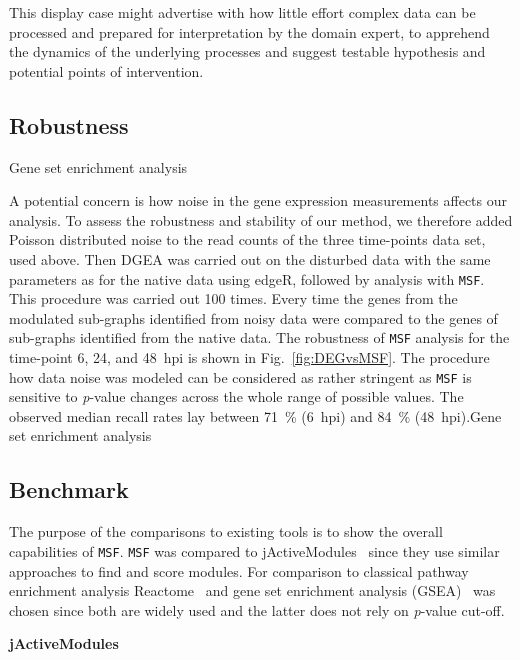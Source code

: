 \documentclass[10pt,a4paper,twocolumn]{article}
\begin{document}
	This display case might advertise with how little effort
        complex data can be processed and prepared for
          interpretation by the domain expert, to apprehend the dynamics of the underlying processes
        and suggest testable hypothesis and potential points of
        intervention.
	
	\subsection*{Robustness}Gene set enrichment analysis
	
	A potential concern is how noise in the gene expression
        measurements affects our analysis. To assess the robustness
        and stability of our method, we therefore added Poisson
        distributed noise to the read counts of the three time-points
        data set, used above. Then DGEA was carried out on the
        disturbed data with the same parameters as for the native data
        using edgeR, followed by analysis with \texttt{MSF}. This
        procedure was carried out 100 times.  Every time the genes
        from the modulated sub-graphs identified from noisy data were
        compared to the genes of sub-graphs identified from the native
        data. The robustness of \texttt{MSF} analysis for the
        time-point 6, 24, and 48~hpi is shown in
        Fig.~\ref{fig:DEGvsMSF}. The procedure how data noise was
        modeled can be considered as rather stringent as \texttt{MSF}
        is sensitive to \textit{p}-value changes across the whole
        range of possible values. The observed median recall rates lay
        between 71~\% (6~hpi) and 84~\% (48~hpi).Gene set enrichment analysis
	
	\subsection*{Benchmark}
	
	 The purpose of the comparisons to existing tools is to show the overall capabilities of \texttt{MSF}. \texttt{MSF} was compared to jActiveModules~\cite{jActiveModules} since they use similar approaches to find and score modules. For comparison to classical pathway enrichment analysis Reactome~\cite{Reactome} and gene set enrichment analysis (GSEA)~\cite{Subramanian15545} was chosen since both are widely used and the latter does not rely on \textit{p}-value cut-off.
	
	\textbf{jActiveModules}
	
\end{document}
